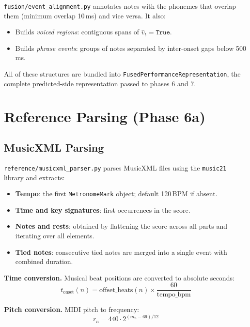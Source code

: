 \documentclass[11pt,letterpaper]{article}
\newcommand{\vh}{\hat{v}}
\begin{document}
\texttt{fusion/event\_alignment.py} annotates notes with the phonemes that
overlap them (minimum overlap 10\,ms) and vice versa.
It also:
\begin{itemize}[noitemsep]
  \item Builds \emph{voiced regions}: contiguous spans of
        $\vh_t = \texttt{True}$.
  \item Builds \emph{phrase events}: groups of notes separated by inter-onset
        gaps below 500\,ms.
\end{itemize}

All of these structures are bundled into
\texttt{FusedPerformanceRepresentation}, the complete predicted-side
representation passed to phases 6 and 7.

\section{Reference Parsing (Phase 6a)}

\subsection{MusicXML Parsing}

\texttt{reference/musicxml\_parser.py} parses MusicXML files using the
\texttt{music21} library and extracts:

\begin{itemize}[noitemsep]
  \item \textbf{Tempo}: the first \texttt{MetronomeMark} object;
        default 120\,BPM if absent.
  \item \textbf{Time and key signatures}: first occurrences in the score.
  \item \textbf{Notes and rests}: obtained by flattening the score across all
        parts and iterating over all elements.
  \item \textbf{Tied notes}: consecutive tied notes are merged into a single
        event with combined duration.
\end{itemize}

\textbf{Time conversion.}
Musical beat positions are converted to absolute seconds:
\[
  t_\text{onset}(n) = \text{offset\_beats}(n) \times \frac{60}{\text{tempo\_bpm}}
\]

\textbf{Pitch conversion.}
MIDI pitch to frequency:
\[
  r_n = 440 \cdot 2^{(m_n - 69)/12}
\]
\end{document}

